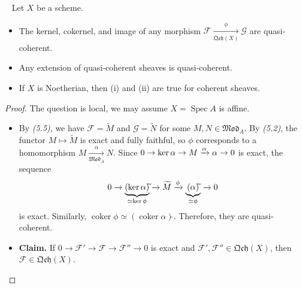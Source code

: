 \documentclass[11pt,a4paper,footinclude=true,headinclude=true]{scrbook} %
\let\Im\relax
\DeclareMathOperator{\Im}{Im}
\DeclareMathOperator{\Spec}{Spec}
\DeclareMathOperator{\Coker}{coker}
\newcommand{\FF}{\mathscr{F}}
\newcommand{\GG}{\mathscr{G}}
\newcommand{\<}{\langle}
\newcommand{\>}{\rangle}
\newcommand{\MOD}{\mathfrak{Mod}}
\newcommand{\qcoh}{\mathfrak{Qch}}
\newenvironment{proposition}[2][]
{\renewcommand\theinnercustomprop{#2}\innercustomprop[#1] 
\begin{mdframed}[backgroundcolor=gray!20]\ }
{\end{mdframed}\endinnercustomprop}
\begin{document}
\begin{proposition}{5.7}
    Let $X$ be a scheme.
    \begin{itemize}
        \item[(i)] The kernel, cokernel, and image of any morphism $\FF\xrightarrow[\qcoh(X)]{\phi}\GG$ are quasi-coherent.
        \item[(ii)] Any extension of quasi-coherent sheaves is quasi-coherent.
        \item[(iii)] If $X$ is Noetherian, then (i) and (ii) are true for coherent sheaves.
    \end{itemize}
\end{proposition}
\begin{proof}
    The question is local, we may assume $X=\Spec A$ is affine.
    \begin{itemize}
        \item[(i)] By \textit{(5.5)}, we have $\FF=\widetilde{M}$ and $\GG=\widetilde{N}$ for some $M,N\in \MOD_A$. By \textit{(5.2)}, the functor $M\mapsto\widetilde{M}$ is exact and fully faithful, so $\phi$ corresponds to a homomorphism $M\xrightarrow[\MOD_A]{\alpha}N$. Since $0\to\ker\alpha\to M\xrightarrow{\alpha}\Im\alpha\to0$ is exact, the sequence
        \begin{align*}
            0\xrightarrow[]{}\underbrace{(\ker\alpha)\widetilde{}}_{\simeq\ker\phi}\xrightarrow[]{}\widetilde{M}\xrightarrow{\phi}\underbrace{(\Im\alpha)\widetilde{}}_{\simeq\Im\phi}\xrightarrow[]{}0
        \end{align*}
        is exact. Similarly, $\Coker\phi\simeq(\Coker\alpha)\widetilde{}$. Therefore, they are quasi-coherent. 
        \item[(ii)] \textbf{Claim.} If $0\to\FF'\to\FF\to\FF''\to0$ is exact and $\FF',\FF''\in\qcoh(X)$, then $\FF\in\qcoh(X)$.
        

\end{itemize}
\end{proof}
\end{document}
